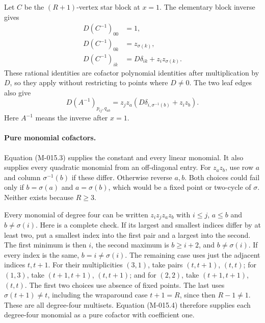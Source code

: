 Let \(C\) be the \((R+1)\)-vertex star block at \(x=1\).
The elementary block inverse gives
\[
 \begin{split}
 D(C^{-1})_{00}&=1,\\
 D(C^{-1})_{0k}&=z_{\sigma(k)},\\
 D(C^{-1})_{ik}&=D\delta_{ik}+z_i z_{\sigma(k)}.
 \end{split}                                             \tag{M-015.3}
\]
These rational identities are cofactor polynomial identities
after multiplication by \(D\), so they apply without
restricting to points where \(D\ne0\).
The two leaf edges also give
\[
 D(A^{-1})_{p_{ij},q_{ab}}
     =z_jz_a\left(D\delta_{i,\sigma^{-1}(b)}+z_i z_b\right).
                                                               \tag{M-015.4}
\]
Here \(A^{-1}\) means the inverse after \(x=1\).

\paragraph{Pure monomial cofactors.}
Equation (M-015.3) supplies the constant and every linear
monomial. It also supplies every quadratic monomial from
an off-diagonal entry. For \(z_a z_b\), use row \(a\)
and column \(\sigma^{-1}(b)\) if these differ. Otherwise
reverse \(a,b\). Both choices could fail only if
\(b=\sigma(a)\) and \(a=\sigma(b)\), which would be
a fixed point or two-cycle of \(\sigma\). Neither exists
because \(R\geq3\).

Every monomial of degree four can be written
\(z_i z_j z_a z_b\) with \(i\leq j\), \(a\leq b\)
and \(b\ne\sigma(i)\). Here is a complete check.
If its largest and smallest indices differ by at least two,
put a smallest index into the first pair and a largest into
the second. The first minimum is then \(i\), the second
maximum is \(b\geq i+2\), and \(b\ne\sigma(i)\).
If every index is the same, \(b=i\ne\sigma(i)\).
The remaining case uses just the adjacent indices \(t,t+1\).
For their multiplicities \((3,1)\), take pairs
\((t,t+1)\), \((t,t)\); for \((1,3)\), take
\((t+1,t+1)\), \((t,t+1)\); and for \((2,2)\), take
\((t+1,t+1)\), \((t,t)\). The first two choices use
absence of fixed points. The last uses
\(\sigma(t+1)\ne t\), including the wraparound case
\(t+1=R\), since then \(R-1\ne1\).
These are all degree-four multisets. Equation (M-015.4)
therefore supplies each degree-four monomial as a pure
cofactor with coefficient one.

